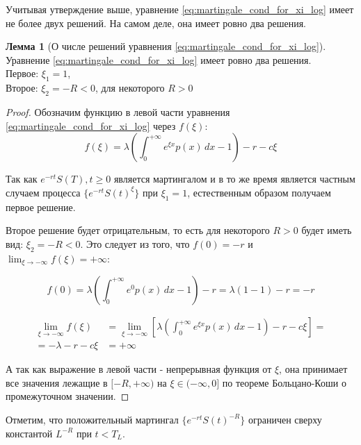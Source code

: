 \documentclass[a4paper,12pt]{article}
\theoremstyle{definition}
\newtheorem{lemma}{Лемма}
\begin{document}
Учитывая утверждение выше, уравнение \eqref{eq:martingale_cond_for_xi_log} имеет не более двух решений. На самом деле, она имеет ровно два решения.
\begin{lemma}[О числе решений уравнения \eqref{eq:martingale_cond_for_xi_log}]\label{thm:solution_for_mart_cond_m1}
Уравнение \eqref{eq:martingale_cond_for_xi_log} имеет ровно два решения. \\
Первое: $\xi_1 = 1$, \\
Второе: $\xi_2 = -R < 0$, для некоторого $R > 0$
\end{lemma}
\begin{proof}
Обозначим функцию в левой части уравнения \eqref{eq:martingale_cond_for_xi_log} через $f(\xi)$:
\begin{equation*}
f(\xi) = \lambda \left(\int_{0}^{+\infty} e^{\xi x} p(x) \,dx - 1\right) - r - c\xi
\end{equation*}

Так как ${e^{-rt} S(T), t \ge 0}$ является мартингалом и в то же время является частным случаем процесса  $\{e^{-rt}S(t)^{\xi}\}$ при $\xi_1 = 1$, естественным образом получаем первое решение.

Второе решение будет отрицательным, то есть для некоторого $R > 0$ будет иметь вид: $\xi_2 = -R < 0$.
Это следует из того, что $f(0) = -r$ и $\lim_{\xi\to-\infty} f(\xi) = +\infty$:

\begin{equation*}
f(0) = \lambda \left(\int_{0}^{+\infty} e^{0} p(x) \,dx - 1\right) - r = \lambda (1 - 1) - r = -r
\end{equation*}

\begin{equation*}
\begin{split}
\lim_{\xi\to-\infty} f(\xi) &= \lim_{\xi\to-\infty} \left[ \lambda \left(\int_{0}^{+\infty} e^{\xi x} p(x) \,dx - 1\right) - r - c\xi \right] =\\
= - \lambda - r - c \xi &= +\infty
\end{split}
\end{equation*}

А так как выражение в левой части - непрерывная функция от $\xi$, она принимает все значения лежащие в $[-R, +\infty)$ на $\xi \in (-\infty, 0]$ по теореме Больцано-Коши о промежуточном значении.
\end{proof}

Отметим, что положительный мартингал $\{e^{-rt} S(t)^{-R}\}$ ограничен сверху константой $L^{-R}$ при $t < T_L$. 
\end{document}
